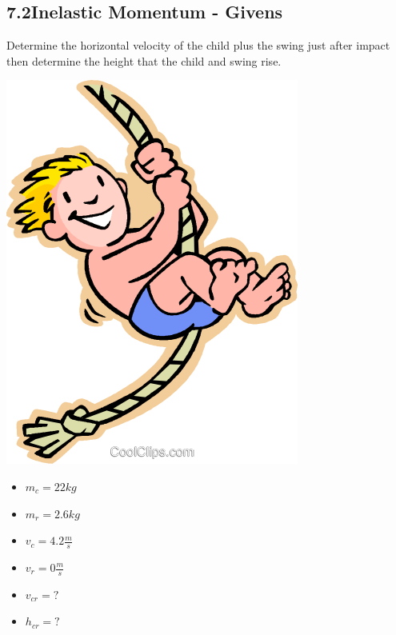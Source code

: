 \documentclass{article}
\begin{document}
\begin{adjustwidth}{1cm}{0pt}
    \subsection*{7.2\hspace*{0.5cm}Inelastic Momentum - Givens}
    Determine the horizontal velocity of the child plus the swing just after impact then determine the height that the child and swing rise.\newline\newline
    \begin{minipage}{0.5\textwidth}
        \includegraphics[scale=0.33]{./images/child_rope}
    \end{minipage}
    \begin{minipage}{0.5\textwidth}
        \begin{itemize}
            \item $m_{c} = 22kg$
            \item $m_{r} = 2.6kg$
            \item $v_{c} = 4.2\frac{m}{s}$
            \item $v_{r} = 0\frac{m}{s}$
            \item $v_{cr} = ?$
            \item $h_{cr} = ?$
        \end{itemize}
    \end{minipage}

\end{adjustwidth}
\end{document}
